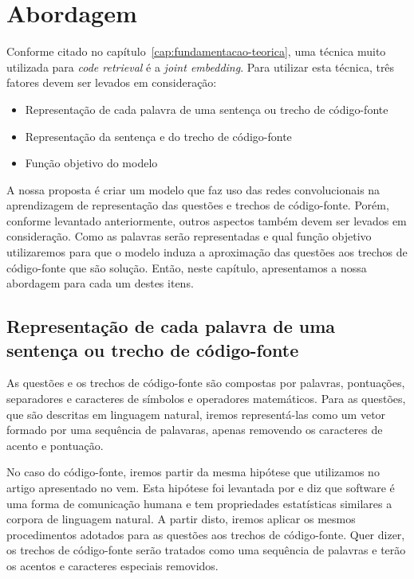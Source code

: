 \chapter{Abordagem}
\label{cap:abordagem}

Conforme citado no capítulo~\ref{cap:fundamentacao-teorica}, uma técnica muito utilizada para \textit{code retrieval} é a \textit{joint embedding}. Para utilizar esta técnica, três fatores devem ser levados em consideração:

\begin{itemize}
    \item Representação de cada palavra de uma sentença ou trecho de código-fonte
    \item Representação da sentença e do trecho de código-fonte
    \item Função objetivo do modelo
\end{itemize}

A nossa proposta é criar um modelo que faz uso das redes convolucionais na aprendizagem de representação das questões e trechos de código-fonte. Porém, conforme levantado anteriormente, outros aspectos também devem ser levados em consideração. Como as palavras serão representadas e qual função objetivo utilizaremos para que o modelo induza a aproximação das questões aos trechos de código-fonte que são solução. Então, neste capítulo, apresentamos a nossa abordagem para cada um destes itens.

\section{Representação de cada palavra de uma sentença ou trecho de código-fonte}
\label{sec:abordagem-representacao-token}

As questões e os trechos de código-fonte são compostas por palavras, pontuações, separadores e caracteres de símbolos e operadores matemáticos. Para as questões, que são descritas em linguagem natural, iremos representá-las como um vetor formado por uma sequência de palavaras, apenas removendo os caracteres de acento e pontuação.

No caso do código-fonte, iremos partir da  mesma hipótese que utilizamos no artigo \cite{marcelo-vem-2019} apresentado no \acrfull{vem}. Esta hipótese foi levantada por \cite{Allamanis:2018:SML} e diz que software é uma forma de comunicação humana e tem propriedades estatísticas similares a corpora de linguagem natural. A partir disto, iremos aplicar os mesmos procedimentos adotados para as questões aos trechos de código-fonte. Quer dizer, os trechos de código-fonte serão tratados como uma sequência de palavras e terão os acentos e caracteres especiais removidos.

